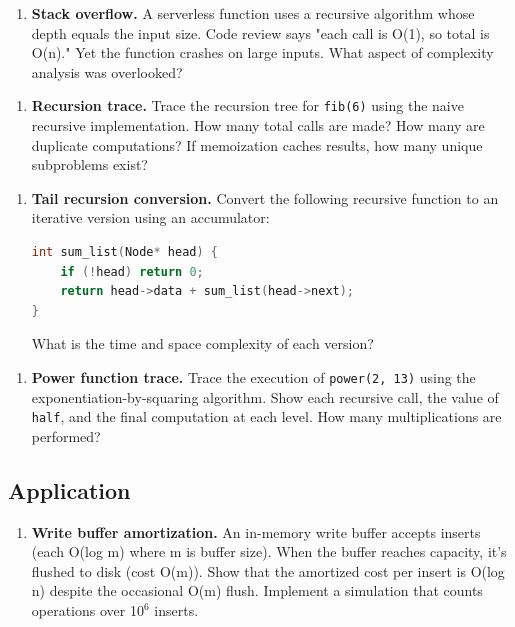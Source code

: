 \begin{enumerate}
\item \textbf{Stack overflow.} A serverless function uses a recursive algorithm whose depth equals the input size. Code review says "each call is O(1), so total is O(n)." Yet the function crashes on large inputs. What aspect of complexity analysis was overlooked?
\end{enumerate}

\begin{enumerate}
\item \textbf{Recursion trace.} Trace the recursion tree for \texttt{fib(6)} using the naive recursive implementation. How many total calls are made? How many are duplicate computations? If memoization caches results, how many unique subproblems exist?
\end{enumerate}

\begin{enumerate}
\item \textbf{Tail recursion conversion.} Convert the following recursive function to an iterative version using an accumulator:
\begin{lstlisting}[language=C++]
int sum_list(Node* head) {
    if (!head) return 0;
    return head->data + sum_list(head->next);
}
\end{lstlisting}
What is the time and space complexity of each version?
\end{enumerate}

\begin{enumerate}
\item \textbf{Power function trace.} Trace the execution of \texttt{power(2, 13)} using the exponentiation-by-squaring algorithm. Show each recursive call, the value of \texttt{half}, and the final computation at each level. How many multiplications are performed?
\end{enumerate}

\subsection{Application}

\begin{enumerate}
\item \textbf{Write buffer amortization.} An in-memory write buffer accepts inserts (each O(log m) where m is buffer size). When the buffer reaches capacity, it's flushed to disk (cost O(m)). Show that the amortized cost per insert is O(log n) despite the occasional O(m) flush. Implement a simulation that counts operations over 1$0^{6}$ inserts.
\end{enumerate}

